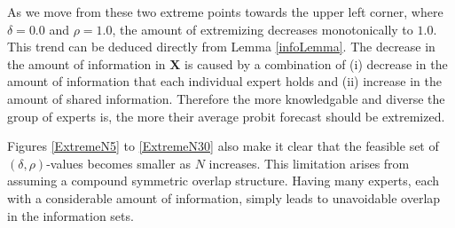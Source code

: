 \documentclass[11pt,twoside]{article}
\begin{document}
 As we move from these two extreme points towards the upper left corner, where $\delta = 0.0$ and $\rho = 1.0$, the amount of extremizing decreases monotonically to $1.0$. This trend can be deduced directly from Lemma \ref{infoLemma}. The decrease in the amount of information in $\boldsymbol{X}$  is caused by a combination of (i) decrease in the amount of information that each individual expert holds and (ii) increase in the amount of shared information. Therefore the more knowledgable and diverse the group of experts is, the more their average probit forecast should be extremized. 

Figures \ref{ExtremeN5} to \ref{ExtremeN30} also make it clear that the feasible set of $(\delta, \rho)$-values becomes smaller as $N$ increases. This limitation arises from assuming a compound symmetric overlap structure. Having many experts, each with a considerable amount of information, simply leads to unavoidable overlap in the information sets. 


\end{document}
